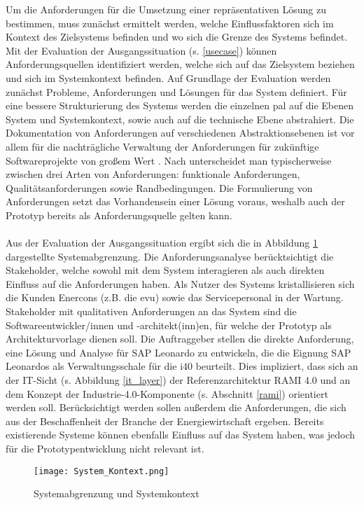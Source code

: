 Um die Anforderungen für die Umsetzung einer repräsentativen Lösung zu bestimmen, muss zunächst ermittelt werden, welche Einflussfaktoren sich im Kontext des Zielsystems befinden und wo sich die Grenze des Systems befindet. Mit der Evaluation der Ausgangssituation (s. \ref{usecase}) können Anforderungsquellen identifiziert werden, welche sich auf das Zielsystem beziehen und sich im Systemkontext befinden. Auf Grundlage der Evaluation werden zunächst Probleme, Anforderungen und Lösungen für das System definiert. Für eine bessere Strukturierung des Systems werden die einzelnen \ac{pal} auf die Ebenen System und Systemkontext, sowie auch auf die technische Ebene abstrahiert. Die Dokumentation von Anforderungen auf verschiedenen Abstraktionsebenen ist vor allem für die nachträgliche Verwaltung der Anforderungen für zukünftige Softwareprojekte von großem Wert \citep{Lauenroth2016}. Nach \citet{IREB2017} unterscheidet man typischerweise zwischen drei Arten von Anforderungen: funktionale Anforderungen, Qualitätsanforderungen sowie Randbedingungen.
Die Formulierung von Anforderungen setzt das Vorhandensein einer Lösung voraus, weshalb auch der Prototyp bereits als Anforderungsquelle gelten kann.
\\\\Aus der Evaluation der Ausgangssituation ergibt sich die in Abbildung \ref{kontext} dargestellte Systemabgrenzung. Die Anforderungsanalyse berücktsichtigt die Stakeholder, welche sowohl mit dem System interagieren als auch direkten Einfluss auf die Anforderungen haben. Als Nutzer des Systems kristallisieren sich die Kunden Enercons (z.B. die \ac{evu}) sowie das Servicepersonal in der Wartung. Stakeholder mit qualitativen Anforderungen an das System sind die Softwareentwickler/innen und -architekt(inn)en, für welche der Prototyp als Architekturvorlage dienen soll. Die Auftraggeber stellen die direkte Anforderung, eine Lösung und Analyse für SAP Leonardo zu entwickeln, die die Eignung SAP Leonardos als Verwaltungsschale für die \ac{i40} beurteilt. Dies impliziert, dass sich an der IT-Sicht (s. Abbildung \ref{it_layer}) der Referenzarchitektur RAMI 4.0 und an dem Konzept der Industrie-4.0-Komponente (s. Abschnitt \ref{rami}) orientiert werden soll. Berücksichtigt werden sollen außerdem die Anforderungen, die sich aus der Beschaffenheit der Branche der Energiewirtschaft ergeben. Bereits existierende Systeme können ebenfalls Einfluss auf das System haben, was jedoch für die Prototypentwicklung nicht relevant ist.


\begin{figure}[h]
  \centering
  \texttt{[image: System\_Kontext.png]}
  \caption[Systemabgrenzung und Systemkontext]{Systemabgrenzung und Systemkontext}
  \label{kontext}
\end{figure}

